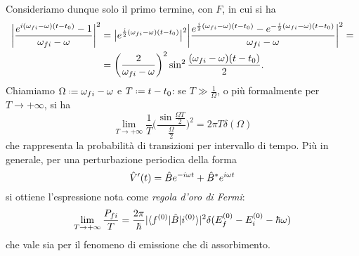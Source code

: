 Consideriamo dunque solo il primo termine, con $F$, in cui si ha
\begin{equation}
	\begin{split}
        \abs[\bigg]{\frac{e^{i(\omega_{fi}-\omega)(t-t_0)}-1}{\omega_{fi}-\omega}}^2
        &=\abs[\big]{e^{\frac{i}2(\omega_{fi}-\omega)(t-t_0)}}^2\abs[\bigg]{\frac{e^{\frac{i}2(\omega_{fi}-\omega)(t-t_0)}-e^{-\frac{i}2(\omega_{fi}-\omega)(t-t_0)}}{\omega_{fi}-\omega}}^2=\\
		&=\bigg(\frac2{\omega_{fi}-\omega}\bigg)^2\sin^2\frac{(\omega_{fi}-\omega)(t-t_0)}2.
	\end{split}
\end{equation}
Chiamiamo $\Omega\defeq\omega_{fi}-\omega$ e $T\defeq t-t_0$: se $T\gg\frac1{\Omega}$, o più formalmente per $T\to+\infty$, si ha
\begin{equation}
	\lim_{T\to+\infty}\frac1{T}\bigg(\frac{\sin\frac{\Omega T}2}{\frac{\Omega}2}\bigg)^2=2\pi T\delta(\Omega)
\end{equation}
che rappresenta la probabilità di transizioni per intervallo di tempo.
Più in generale, per una perturbazione periodica della forma
\begin{equation}
	\op V'(t)=\op B e^{-i\omega t}+\op B^* e^{i\omega t}
	\label{eq:perturbazione-periodica-generica}
\end{equation}
si ottiene l'espressione nota come \emph{regola d'oro di Fermi}:
\begin{equation}
	\lim_{T\to+\infty}\frac{P_{fi}}{T}=\frac{2\pi}{\hbar}\abs{\bra{f^{(0)}}\op B\ket{i^{(0)}}}^2\delta(E_f^{(0)}-E_i^{(0)}-\hbar\omega)
	\label{eq:regola-oro-fermi}
\end{equation}
che vale sia per il fenomeno di emissione che di assorbimento.

